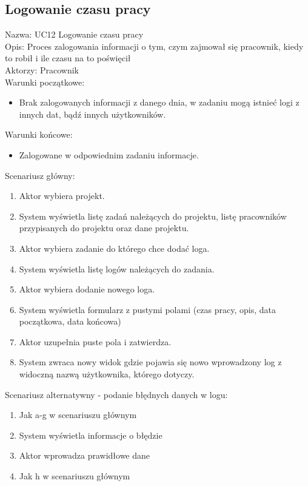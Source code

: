 \subsection{Logowanie czasu pracy}
\begin{adjustwidth}{5em}{0pt}
Nazwa: UC12 Logowanie czasu pracy\\
Opis: Proces zalogowania informacji o tym, czym zajmował się pracownik, kiedy to robił i ile czasu na to poświęcił \\
Aktorzy: Pracownik \\
Warunki początkowe:
\begin{itemize}
\item Brak zalogowanych informacji z danego dnia, w zadaniu mogą istnieć logi z innych dat, bądź innych użytkowników.
\end{itemize}
Warunki końcowe:
\begin{itemize}
\item Zalogowane w odpowiednim zadaniu informacje.
\end{itemize}
Scenariusz główny:
\begin{enumerate}
\item Aktor wybiera projekt.
\item System wyświetla listę zadań należących do projektu, listę pracowników przypisanych do projektu oraz dane projektu.
\item Aktor wybiera zadanie do którego chce dodać loga.
\item System wyświetla listę logów należących do zadania.
\item Aktor wybiera dodanie nowego loga.
\item System wyświetla formularz z pustymi polami (czas pracy, opis, data początkowa, data końcowa)
\item Aktor uzupełnia puste pola i zatwierdza.
\item System zwraca nowy widok gdzie pojawia się nowo wprowadzony log z widoczną nazwą użytkownika, którego dotyczy.
\end{enumerate}
Scenariusz alternatywny - podanie błędnych danych w logu: 
\begin{enumerate}
\item Jak a-g w scenariuszu głównym
\item System wyświetla informacje o błędzie
\item Aktor wprowadza prawidłowe dane
\item Jak h w scenariuszu głównym
\end{enumerate}
\end{adjustwidth}

